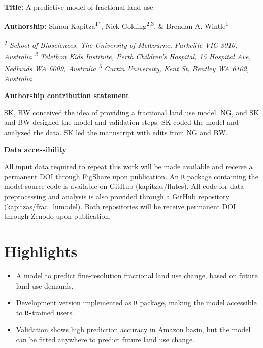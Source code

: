 \documentclass[titlesmallcaps,copyrightpage]{uomthesis}\usepackage[]{graphicx}\usepackage[]{color}
\begin{document}
{\parindent0pt
\textbf{Title:} A predictive model of fractional land use

\vspace{1cm}

\textbf{Authorship:} Simon Kapitza\textsuperscript{1*}, Nick
Golding\textsuperscript{2,3}, \& Brendan A. Wintle\textsuperscript{1}

\vspace{1cm}

\emph{\textsuperscript{1} School of Biosciences, The University of
Melbourne, Parkville VIC 3010, Australia \newline \textsuperscript{2}
Telethon Kids Institute, Perth Children's Hospital, 15 Hospital Ave,
Nedlands WA 6009, Australia \newline \textsuperscript{3} Curtin
University, Kent St, Bentley WA 6102, Australia}


\vspace{1cm}

\textbf{Authorship contribution statement}

SK, BW conceived the idea of providing a fractional land use model. NG,
and SK and BW designed the model and validation steps. SK coded the
model and analyzed the data. SK led the manuscript with edits from NG
and BW.

\vspace{1cm}

\textbf{Data accessibility}

All input data required to repeat this work will be made available and
receive a permanent DOI through FigShare upon publication. An \texttt{R} package
containing the model source code is available on GitHub
(kapitzas/flutes). All code for data preprocessing and analysis is also
provided through a GitHub repository (kapitzas/frac\_lumodel). Both
repositories will be receive permanent DOI through Zenodo upon
publication.
}

\newpage

\section{Highlights}

\begin{itemize}
\item
  A model to predict fine-resolution fractional land use change, based
  on future land use demands.
\item
  Development version implemented as \texttt{R} package, making the model
  accessible to \texttt{R-}trained users.
\item
  Validation shows high prediction accuracy in Amazon basin, but the
  model can be fitted anywhere to predict future land use change.
\end{itemize}
\end{document}
